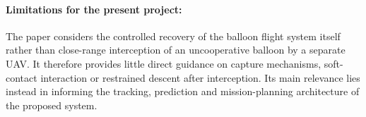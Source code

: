 \paragraph{Limitations for the present project:} The paper considers the controlled recovery of the balloon flight system itself rather than close-range interception of an uncooperative balloon by a separate UAV. It therefore provides little direct guidance on capture mechanisms, soft-contact interaction or restrained descent after interception. Its main relevance lies instead in informing the tracking, prediction and mission-planning architecture of the proposed system. \cite{Tang2022TrajectoryPrediction}







